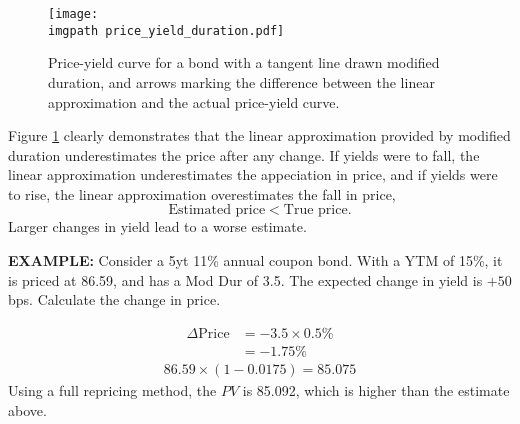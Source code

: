 \documentclass[../notes_compiled.tex]{subfiles}
\begin{document}
\begin{itemize}
\begin{figure}[h]
  \centering
  \texttt{[image: \\imgpath price\_yield\_duration.pdf]}
  \caption{Price-yield curve for a bond with a tangent line drawn modified duration, and arrows marking the difference between the linear approximation and the actual price-yield curve.}
  \label{fig-duration}
\end{figure}
Figure \ref{fig-duration} clearly demonstrates that the linear approximation provided by modified duration underestimates the price after any change. If yields were to fall, the linear approximation underestimates the appeciation in price, and if yields were to rise, the linear approximation overestimates the fall in price,
\begin{equation*}
\text{Estimated price} < \text{True price}.
\end{equation*}
Larger changes in yield lead to a worse estimate.

{\color{RedViolet}
\item[] \textbf{EXAMPLE:} Consider a 5yt 11\% annual coupon bond. With a YTM of 15\%, it is priced at 86.59, and has a Mod Dur of 3.5. The expected change in yield is $+50$ bps. Calculate the change in price.
}
{\color{RoyalBlue}
\begin{align*}
\Delta \text{Price} &= -3.5\times 0.5\% \\
&= -1.75\%
\end{align*}
\begin{gather*}
86.59 \times (1-0.0175) = 85.075
\end{gather*}
Using a full repricing method, the $PV$ is 85.092, which is higher than the estimate above.
}
\end{itemize}
\end{document}
